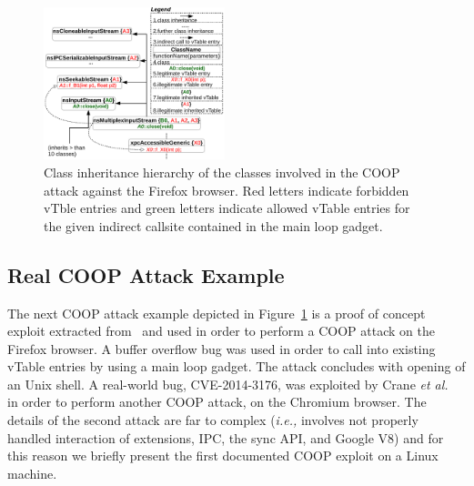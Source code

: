 \begin{figure}[h!]
    \centering
    \includegraphics[width=0.47\textwidth]{figures/class_hierarchy.pdf}
\caption{Class inheritance hierarchy of the classes involved in the COOP attack against the Firefox browser. Red letters 
indicate forbidden vTble entries and green letters indicate allowed vTable entries for the given indirect callsite
contained in the main loop gadget.}
\label{Class exploit}
\end{figure}

\subsection{Real COOP Attack Example}
\label{Running Example: CVE X}
The next COOP attack example depicted in Figure~\ref{Class exploit}
is a proof of concept exploit extracted from~\cite{schuster:coop} and used in order to perform 
a COOP attack on the Firefox browser. A buffer overflow bug was used in order to call 
into existing vTable entries by using a main loop gadget. 
The attack concludes with opening of an Unix shell. 
A real-world bug, CVE-2014-3176, was exploited by Crane \textit{et al.}~\cite{crane:readactor++}
in order to perform another COOP attack, on the Chromium browser. The details of the 
second attack are far to complex (\textit{i.e.,} involves not properly handled interaction of 
extensions, IPC, the sync API, and Google V8) and for this reason we briefly present the first 
documented COOP exploit on a Linux machine.

